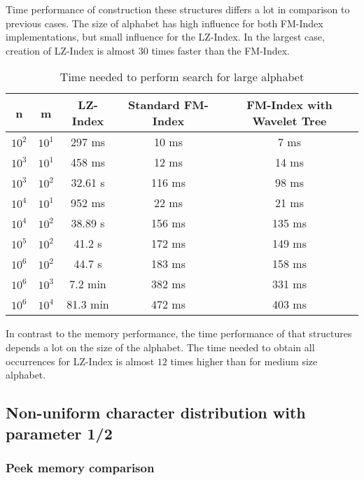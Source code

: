 Time performance of construction these structures differs a lot in comparison to previous cases. The size of alphabet has high influence for both FM-Index implementations, but small influence for the LZ-Index. In the largest case, creation of LZ-Index is almost $30$ times faster than the FM-Index.

\begin{table}[H]
\begin{center}
\caption{Time needed to perform search for large alphabet}
\begin{tabular}{|c|c|c|c|c|}
\hline
\rowcolor[HTML]{C0C0C0}
n & m & LZ-Index & Standard FM-Index & FM-Index with Wavelet Tree \\ \hline
$10^{2}$ & $10^{1}$ & 297 ms & 10 ms & 7 ms \\ \hline
$10^{3}$ & $10^{1}$ & 458 ms & 12 ms & 14 ms \\ \hline
$10^{3}$ & $10^{2}$ & 32.61 s & 116 ms & 98 ms \\ \hline
$10^{4}$ & $10^{1}$ & 952 ms & 22 ms & 21 ms \\ \hline
$10^{4}$ & $10^{2}$ & 38.89 s & 156 ms & 135 ms \\ \hline
$10^{5}$ & $10^{2}$ & 41.2 s & 172 ms & 149 ms \\ \hline
$10^{6}$ & $10^{2}$ & 44.7 s & 183 ms & 158 ms \\ \hline
$10^{6}$ & $10^{3}$ & 7.2 min & 382 ms & 331 ms \\ \hline
$10^{6}$ & $10^{4}$ & 81.3 min & 472 ms & 403 ms \\ \hline
\end{tabular}
\end{center}
\end{table}

In contrast to the memory performance, the time performance of that structures depends a lot on the size of the alphabet. The time needed to obtain all occurrences for LZ-Index is almost $12$ times higher than for medium size alphabet.

\subsection{Non-uniform character distribution with parameter 1/2}


\subsubsection{Peek memory comparison}

